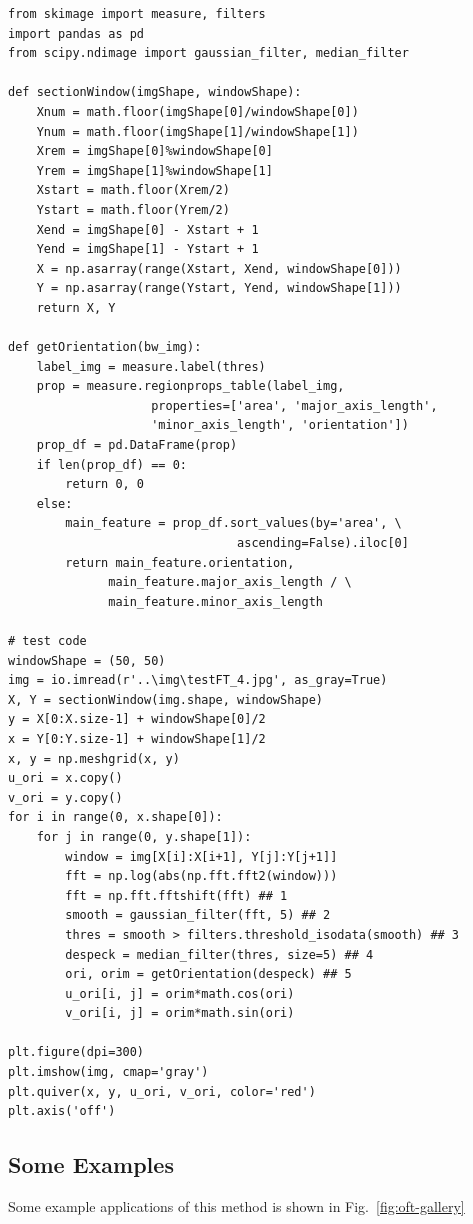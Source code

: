 \begin{verbatim}
from skimage import measure, filters
import pandas as pd
from scipy.ndimage import gaussian_filter, median_filter

def sectionWindow(imgShape, windowShape):
    Xnum = math.floor(imgShape[0]/windowShape[0])
    Ynum = math.floor(imgShape[1]/windowShape[1])
    Xrem = imgShape[0]%windowShape[0]
    Yrem = imgShape[1]%windowShape[1]
    Xstart = math.floor(Xrem/2)
    Ystart = math.floor(Yrem/2)
    Xend = imgShape[0] - Xstart + 1
    Yend = imgShape[1] - Ystart + 1
    X = np.asarray(range(Xstart, Xend, windowShape[0]))
    Y = np.asarray(range(Ystart, Yend, windowShape[1]))
    return X, Y

def getOrientation(bw_img):
    label_img = measure.label(thres)
    prop = measure.regionprops_table(label_img,
                    properties=['area', 'major_axis_length',
                    'minor_axis_length', 'orientation'])
    prop_df = pd.DataFrame(prop)
    if len(prop_df) == 0:
        return 0, 0
    else:
        main_feature = prop_df.sort_values(by='area', \
                                ascending=False).iloc[0]
        return main_feature.orientation,
              main_feature.major_axis_length / \
              main_feature.minor_axis_length

# test code
windowShape = (50, 50)
img = io.imread(r'..\img\testFT_4.jpg', as_gray=True)
X, Y = sectionWindow(img.shape, windowShape)
y = X[0:X.size-1] + windowShape[0]/2
x = Y[0:Y.size-1] + windowShape[1]/2
x, y = np.meshgrid(x, y)
u_ori = x.copy()
v_ori = y.copy()
for i in range(0, x.shape[0]):
    for j in range(0, y.shape[1]):
        window = img[X[i]:X[i+1], Y[j]:Y[j+1]]
        fft = np.log(abs(np.fft.fft2(window)))
        fft = np.fft.fftshift(fft) ## 1
        smooth = gaussian_filter(fft, 5) ## 2
        thres = smooth > filters.threshold_isodata(smooth) ## 3
        despeck = median_filter(thres, size=5) ## 4
        ori, orim = getOrientation(despeck) ## 5
        u_ori[i, j] = orim*math.cos(ori)
        v_ori[i, j] = orim*math.sin(ori)

plt.figure(dpi=300)
plt.imshow(img, cmap='gray')
plt.quiver(x, y, u_ori, v_ori, color='red')
plt.axis('off')
\end{verbatim}

\subsection{Some Examples}
\label{sec:oft-gallery}
Some example applications of this method is shown in Fig.~\ref{fig:oft-gallery}

